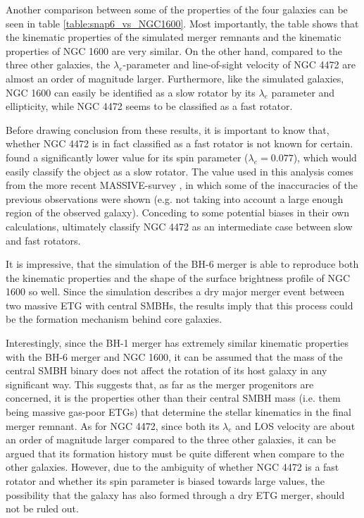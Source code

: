 \documentclass[english, twoside]{HYgradu}
\begin{document}
Another comparison between some of the properties of the four galaxies can be seen in table \ref{table:snap6_vs_NGC1600}. Most importantly, the table shows that the kinematic properties of the simulated merger remnants and the kinematic properties of NGC 1600 are very similar. On the other hand, compared to the three other galaxies, the $\lambda_e$-parameter and line-of-sight velocity of NGC 4472 are almost an order of magnitude larger. Furthermore, like the simulated galaxies, NGC 1600 can easily be identified as a slow rotator by its $\lambda_e$ parameter and ellipticity, while NGC 4472 seems to be classified as a fast rotator. 

Before drawing conclusion from these results, it is important to know that, whether NGC 4472 is in fact classified as a fast rotator is not known for certain. \cite{Emsellem2011} found a significantly lower value for its spin parameter ($\lambda_e = 0.077$), which would easily classify the object as a slow rotator. The value used in this analysis comes from the more recent MASSIVE-survey \citep{Ma2014MASSIVE, Veale2017veldisp}, in which some of the inaccuracies of the previous observations were shown (e.g. not taking into account a large enough region of the observed galaxy). Conceding to some potential biases in their own calculations, \cite{Veale2017veldisp} ultimately classify NGC 4472 as an intermediate case between slow and fast rotators.

It is impressive, that the simulation of the BH-6 merger is able to reproduce both the kinematic properties and the shape of the surface brightness profile of NGC 1600 so well. Since the simulation describes a dry major merger event between two massive ETG with central SMBHs, the results imply that this process could be the formation mechanism behind core galaxies. 

Interestingly, since the BH-1 merger has extremely similar kinematic properties with the BH-6 merger and NGC 1600, it can be assumed that the mass of the central SMBH binary does not affect the rotation of its host galaxy in any significant way. This suggests that, as far as the merger progenitors are concerned, it is the properties other than their central SMBH mass (i.e. them being massive gas-poor ETGs) that determine the stellar kinematics in the final merger remnant. As for NGC 4472, since both its $\lambda_e$ and LOS velocity are about an order of magnitude larger compared to the three other galaxies, it can be argued that its formation history must be quite different when compare to the other galaxies. However, due to the ambiguity of whether NGC 4472 is a fast rotator and whether its spin parameter is biased towards large values, the possibility that the galaxy has also formed through a dry ETG merger, should not be ruled out.
\end{document}
